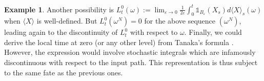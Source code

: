\documentclass[11pt]{article}
\theoremstyle{plain}
\theoremstyle{definition}
\newtheorem{example}{Example}
\DeclareMathOperator{\X}{\mathbb{X}}
\DeclareMathOperator{\calO}{\mathcal{O}}
\begin{document}
\begin{example}
         Another possibility  is 
         $L^0_t(\omega) := \lim_{\varepsilon \to 0} \frac{1}{2\varepsilon}\int_0^t \mathds{1}_{B_{\varepsilon}}(X_s)d\langle X \rangle_s(\omega) $ 
         when $\langle X \rangle$ is well-defined. But  $L^0_t(\omega^N) = 0$ for the above sequence $(\omega^N)$, leading again to the discontinuity of $L^0_t$ with respect to $\omega$.  
         Finally, we could derive  the local time at zero (or any other level) from Tanaka's formula 
         \cite[Chapter VI]{RevuzYor}. 
   However, the expression would involve stochastic integrals  which  are infamously discontinuous with respect to the input path. This representation  is thus subject to the same fate as the previous ones. 
\end{example}
\end{document}

